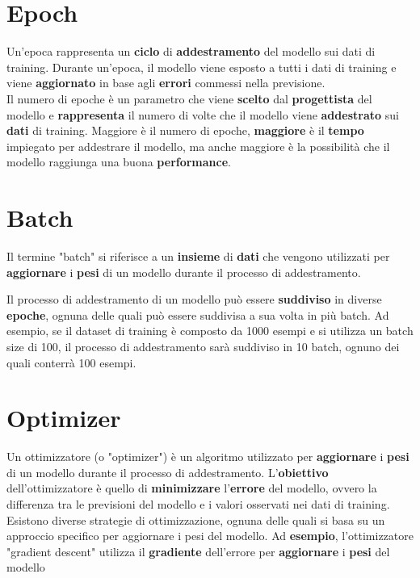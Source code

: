 \documentclass{article}
\begin{document}
\section{Epoch}
Un'epoca rappresenta un \textbf{ciclo} di \textbf{addestramento} del modello sui dati di training. Durante un'epoca, il modello viene esposto a tutti i dati di training e viene \textbf{aggiornato} in base agli \textbf{errori} commessi nella previsione.
\\
Il numero di epoche è un parametro che viene \textbf{scelto} dal \textbf{progettista} del modello e \textbf{rappresenta} il numero di volte che il modello viene \textbf{addestrato} sui \textbf{dati} di training. Maggiore è il numero di epoche, \textbf{maggiore} è il \textbf{tempo} impiegato per addestrare il modello, ma anche maggiore è la possibilità che il modello raggiunga una buona \textbf{performance}.


\section{Batch}
Il termine "batch" si riferisce a un \textbf{insieme} di \textbf{dati} che vengono utilizzati per \textbf{aggiornare} i \textbf{pesi} di un modello durante il processo di addestramento.

Il processo di addestramento di un modello può essere \textbf{suddiviso} in diverse \textbf{epoche}, ognuna delle quali può essere suddivisa a sua volta in più batch. Ad esempio, se il dataset di training è composto da 1000 esempi e si utilizza un batch size di 100, il processo di addestramento sarà suddiviso in 10 batch, ognuno dei quali conterrà 100 esempi.


\section{Optimizer}
Un ottimizzatore (o "optimizer") è un algoritmo utilizzato per \textbf{aggiornare} i \textbf{pesi} di un modello durante il processo di addestramento. L'\textbf{obiettivo} dell'ottimizzatore è quello di \textbf{minimizzare} l'\textbf{errore} del modello, ovvero la differenza tra le previsioni del modello e i valori osservati nei dati di training.
\\
Esistono diverse strategie di ottimizzazione, ognuna delle quali si basa su un approccio specifico per aggiornare i pesi del modello. Ad \textbf{esempio}, l'ottimizzatore "gradient descent" utilizza il \textbf{gradiente} dell'errore per \textbf{aggiornare} i \textbf{pesi} del modello
\end{document}

